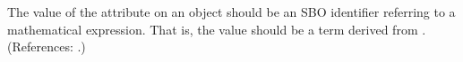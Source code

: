 The value of the attribute  on an \InitialAssignment object
should be an SBO identifier referring to a mathematical expression.  That
is, the value should be a term derived from \sbomathformula.  (References:
.)
